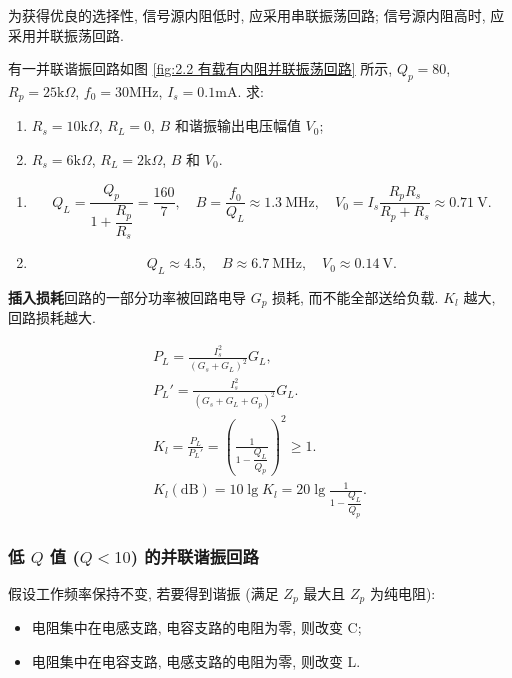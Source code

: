 为获得优良的选择性, 信号源内阻低时, 应采用串联振荡回路; 信号源内阻高时, 应采用并联振荡回路.

\begin{exampleprob}
    有一并联谐振回路如图 \ref{fig:2.2 有载有内阻并联振荡回路} 所示, $Q_p=80$, $R_p=25\mathrm{k}\Omega$, $f_0=30$MHz, $I_s=0.1$mA. 求:

    \begin{enumerate}
        \item $R_s=10\mathrm{k}\Omega$, $R_L=0$, $B$ 和谐振输出电压幅值 $V_0$;
        \item $R_s=6\mathrm{k}\Omega$, $R_L=2\mathrm{k}\Omega$, $B$ 和 $V_0$.
    \end{enumerate}

    \begin{solution}
        \begin{enumerate}
            \item \begin{equation*}
                      Q_L=\frac{Q_p}{1+\dfrac{R_p}{R_s}}=\frac{160}{7},\quad B=\frac{f_0}{Q_L}\approx 1.3\ \mathrm{MHz},\quad V_0=I_s\frac{R_pR_s}{R_p+R_s}\approx 0.71\ \mathrm{V}.
                  \end{equation*}
            \item \begin{equation*}
                      Q_L\approx 4.5,\quad B\approx 6.7\ \mathrm{MHz},\quad V_0\approx 0.14\ \mathrm{V}.
                  \end{equation*}
        \end{enumerate}
    \end{solution}
\end{exampleprob}

\textbf{插入损耗}\quad 回路的一部分功率被回路电导 $G_p$ 损耗, 而不能全部送给负载. $K_l$ 越大, 回路损耗越大.

\rmg
\begin{gather}
    P_L=\frac{I_s^2}{(G_s+G_L)^2}G_L, \\
    P_L'=\frac{I_s^2}{(G_s+G_L+G_p)^2}G_L. \\
    K_l=\frac{P_L}{P_L'}=\left(\frac{1}{1-\dfrac{Q_L}{Q_p}}\right)^2\geq 1. \label{eq:2.2 insertion loss} \\
    K_l(\mathrm{dB})=10\lg K_l=20\lg\frac{1}{1-\dfrac{Q_L}{Q_p}}.
\end{gather}

\subsubsection{低 \texorpdfstring{$Q$}{Q} 值 (\texorpdfstring{$Q<10$}{Q leq 10}) 的并联谐振回路}

假设工作频率保持不变, 若要得到谐振 (满足 $Z_p$ 最大且 $Z_p$ 为纯电阻):

\begin{itemize}
    \item 电阻集中在电感支路, 电容支路的电阻为零, 则改变 C;
    \item 电阻集中在电容支路, 电感支路的电阻为零, 则改变 L.
\end{itemize}
